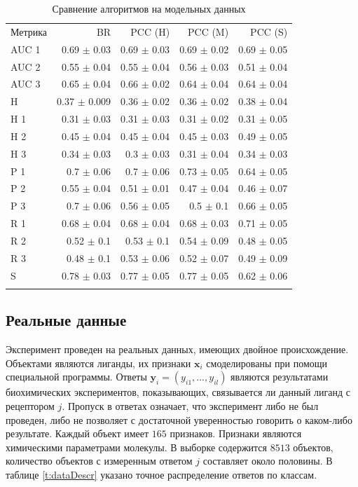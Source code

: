 \documentclass[12pt,twoside]{article}
\newcommand{\x}{\mathbf{x}}
\newcommand{\y}{\mathbf{y}}
\begin{document}
\begin{table}[H]%
	\caption{Сравнение алгоритмов на модельных данных}
	\label{t:modelData}
	\centering\medskip%
	\begin{tabular}{lrrrr}
		\headline
		Метрика &             BR &         PCC (H) &         PCC (M) &         PCC (S) \\
		\headline
		AUC 1 &   0.69 $\pm$ 0.03 &  0.69 $\pm$ 0.03 &  0.69 $\pm$ 0.02 &  0.69 $\pm$ 0.05 \\
		AUC 2 &   0.55 $\pm$ 0.04 &  0.55 $\pm$ 0.04 &  0.56 $\pm$ 0.03 &  0.51 $\pm$ 0.04 \\
		AUC 3 &   0.65 $\pm$ 0.04 &  0.66 $\pm$ 0.02 &  0.64 $\pm$ 0.04 &  0.64 $\pm$ 0.04 \\
		H     &  0.37 $\pm$ 0.009 &  0.36 $\pm$ 0.02 &  0.36 $\pm$ 0.02 &  0.38 $\pm$ 0.04 \\
		H 1   &   0.31 $\pm$ 0.03 &  0.31 $\pm$ 0.03 &  0.31 $\pm$ 0.02 &  0.31 $\pm$ 0.05 \\
		H 2   &   0.45 $\pm$ 0.04 &  0.45 $\pm$ 0.04 &  0.45 $\pm$ 0.03 &  0.49 $\pm$ 0.05 \\
		H 3   &   0.34 $\pm$ 0.03 &   0.3 $\pm$ 0.03 &  0.31 $\pm$ 0.04 &  0.34 $\pm$ 0.03 \\
		P 1   &    0.7 $\pm$ 0.06 &   0.7 $\pm$ 0.06 &  0.73 $\pm$ 0.05 &  0.64 $\pm$ 0.05 \\
		P 2   &   0.55 $\pm$ 0.04 &  0.51 $\pm$ 0.01 &  0.47 $\pm$ 0.04 &  0.46 $\pm$ 0.07 \\
		P 3   &    0.7 $\pm$ 0.06 &  0.56 $\pm$ 0.05 &    0.5 $\pm$ 0.1 &  0.66 $\pm$ 0.05 \\
		R 1   &   0.68 $\pm$ 0.04 &  0.68 $\pm$ 0.04 &  0.68 $\pm$ 0.03 &  0.71 $\pm$ 0.05 \\
		R 2   &    0.52 $\pm$ 0.1 &   0.53 $\pm$ 0.1 &  0.54 $\pm$ 0.09 &  0.48 $\pm$ 0.05 \\
		R 3   &    0.48 $\pm$ 0.1 &  0.53 $\pm$ 0.06 &  0.52 $\pm$ 0.07 &  0.49 $\pm$ 0.09 \\
		S     &   0.78 $\pm$ 0.03 &  0.77 $\pm$ 0.05 &  0.77 $\pm$ 0.05 &  0.62 $\pm$ 0.06 \\
		\headline
	\end{tabular}
\end{table}

\subsection{Реальные данные}
Эксперимент проведен на реальных данных, имеющих двойное происхождение. Объектами являются лиганды, их признаки $\x_i$ смоделированы при помощи специальной программы. Ответы $\y_i=(y_{i1},...,y_{il})$ являются результатами биохимических экспериментов, показывающих, связывается ли данный лиганд с рецептором $j$. Пропуск в ответах означает, что эксперимент либо не был проведен, либо не позволяет с достаточной уверенностью говорить о каком-либо результате. Каждый объект имеет $165$ признаков. Признаки являются химическими параметрами молекулы. В выборке содержится $8513$ объектов, количество объектов с измеренным ответом $j$ составляет около половины. В таблице \ref{t:dataDescr} указано точное распределение ответов по классам.
\end{document}
